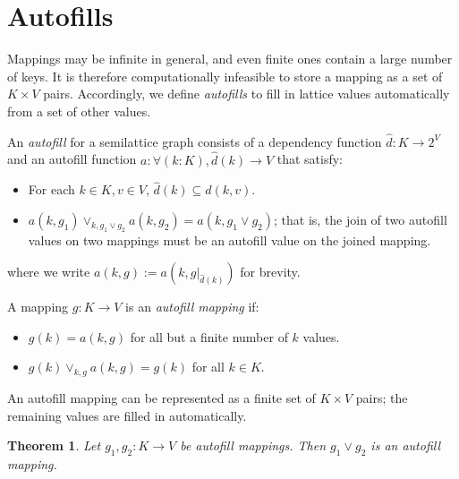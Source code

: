 \documentclass{article}
\newtheorem{theorem}{Theorem}
\begin{document}
    \section{Autofills}

        Mappings may be infinite in general, and even finite ones contain a large number of keys. It is therefore computationally infeasible to store a mapping as a set of $K \times V$ pairs. Accordingly, we define \emph{autofills} to fill in lattice values automatically from a set of other values.




        An \emph{autofill} for a semilattice graph consists of a dependency function $\hat{d}: K \rightarrow 2^V$ and an autofill function $a : \forall (k:K), \hat{d}(k) \rightarrow V$ that satisfy:

        \begin{itemize}
          \item
            For each $k \in K, v \in V$, $\hat{d}(k) \subseteq d(k, v)$.
          \item
            $a(k, g_1) \vee_{k, g_1 \vee g_2} a(k, g_2) = a(k, g_1 \vee g_2)$; that is, the join of two autofill values on two mappings must be an autofill value on the joined mapping.
        \end{itemize}

        where we write $a(k, g) := a(k, g|_{\hat{d}(k)})$ for brevity.


        A mapping $g : K \rightarrow V$ is an \emph{autofill mapping} if:
        
        \begin{itemize}
          \item $g(k) = a(k, g)$ for all but a finite number of $k$ values.
          \item $g(k) \vee_{k, g} a(k, g) = g(k)$ for all $k \in K$.
        \end{itemize}


        An autofill mapping can be represented as a finite set of $K \times V$ pairs; the remaining values are filled in automatically.

        \begin{theorem}
          Let $g_1, g_2 : K \rightarrow V$ be autofill mappings. Then $g_1 \vee g_2$ is an autofill mapping.
        \end{theorem}
\end{document}
